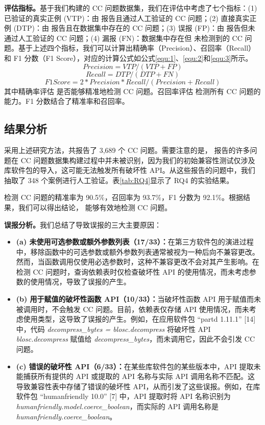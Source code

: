 \textbf{评估指标。}基于我们构建的 CC 问题数据集，我们在评估中考虑了七个指标：(1) 已验证的真实正例 (VTP)：由 \tool{} 报告且通过人工验证的 CC 问题；(2) 直接真实正例 (DTP)：由 \tool{} 报告且在数据集中存在的 CC 问题；(3) 误报 (FP)：由 \tool{} 报告但未通过人工验证的 CC 问题；(4) 漏报 (FN)：数据集中存在但 \tool{} 未检测到的 CC 问题。基于上述四个指标，我们可以计算出精确率（Precision）、召回率（Recall）和 F1 分数（F1 Score），对应的计算公式如公式\ref{equ:1}、\ref{equ:2}和\ref{equ:3}所示。
\begin{equation}
	\label{equ:1}
	Precision = VTP / (VTP + FP)
\end{equation}
\begin{equation}
	\label{equ:2}
	Recall = DTP / (DTP + FN)
\end{equation}
\begin{equation}
	\label{equ:3}
	F1 Score =2 * Precision * Recall / ( Precision + Recall)
\end{equation}
其中精确率评估\tool{} 是否能够精准地检测 CC 问题。召回率评估\tool{} 检测所有 CC 问题的能力。F1 分数结合了精准率和召回率。

\subsection{结果分析}
采用上述研究方法，\tool{}共报告了 3,689 个 CC 问题。需要注意的是，\tool{} 报告的许多问题在 CC 问题数据集构建过程中并未被识别，因为我们的初始兼容性测试仅涉及库软件包的导入，这可能无法触发所有破坏性 API。从这些报告的问题中，我们抽取了 348 个案例进行人工验证。表\ref{tab:RQ4}显示了 RQ4 的实验结果。

\tool{} 检测 CC 问题的精准率为 90.5\%，召回率为 93.7\%，F1 分数为 92.1\%。根据结果，我们可以得出结论，\tool{} 能够有效地检测 CC 问题。

\textbf{误报分析。}我们总结了导致误报的三大主要原因：
\begin{itemize}
	\item \textbf{(a) 未使用可选参数或额外参数列表（17/33）：}在第三方软件包的演进过程中，移除函数中的可选参数或额外参数列表通常被视为一种后向不兼容更改。然而，当函数调用仅使用必选参数时，这种不兼容更改不会对其产生影响。在检测 CC 问题时，\tool{}查询依赖表时仅检查破坏性 API 的使用情况，而未考虑参数的使用情况，导致了误报的产生。
	\item \textbf{ (b) 用于赋值的破坏性函数 API（10/33）：}当破坏性函数 API 用于赋值而未被调用时，不会触发 CC 问题。目前，依赖表仅存储 API 使用情况，而未考虑使用类型，这导致了误报的产生。例如，在应用软件包 “partd 1.11.1” [14] 中，代码 \textit{decompress\_bytes = blosc.decompress} 将破坏性 API \textit{blosc.decompress} 赋值给 \textit{decompress\_bytes}，而未调用它，因此不会引发 CC 问题。
	\item \textbf{ (c) 错误的破坏性 API（6/33）：}在某些库软件包的某些版本中，API 提取未能捕获所有提供的 API 或提取的 API 名称与实际 API 调用名称不匹配。这导致兼容性表中存储了错误的破坏性 API，从而引发了这些误报。例如，在库软件包 “humanfriendly 10.0” [7] 中，API 提取时将 API 名称识别为 \textit{humanfriendly.model.coerce\_boolean}，而实际的 API 调用名称是 \textit{humanfriendly.coerce\_boolean}。
\end{itemize}

